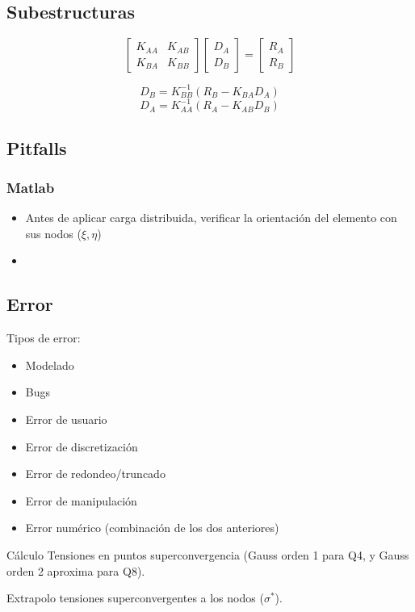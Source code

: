 \documentclass[11pt, a4paper,titlepage]{article}
\newcommand{\rmfont}[1]{{\fontfamily{ptm}\selectfont%
#1}}
\newcommand{\Matlab}{\rmfont{\sc Matlab}}
\begin{document}
\subsection{Subestructuras}
\[
\begin{bmatrix}
    K_{AA} & K_{AB} \\
    K_{BA} & K_{BB}
\end{bmatrix}
\begin{bmatrix}
    D_A \\
    D_B
\end{bmatrix}
= \begin{bmatrix}
    R_A \\
    R_B
\end{bmatrix}
\]

\[ 
D_B = K_{BB}^{-1} (R_B - K_{BA}D_A)
\]
\[
D_A =K_{AA}^{-1}(R_A-K_{AB}D_B)
\]

\subsection{Pitfalls}
\subsubsection*{\Matlab{}}
\begin{itemize}
    \item Antes de aplicar carga distribuida, verificar la orientación del elemento con sus nodos ($\xi,\eta$)
    \item
\end{itemize}
\subsection{Error}
Tipos de error:
\begin{itemize}
    \item Modelado
    \item Bugs
    \item Error de usuario
    \item Error de discretización
    \item Error de redondeo/truncado
    \item Error de manipulación 
    \item Error numérico (combinación de los dos anteriores)
\end{itemize}

Cálculo Tensiones en puntos superconvergencia (Gauss orden 1 para Q4, y Gauss orden 2 aproxima para Q8).

Extrapolo tensiones superconvergentes a los nodos ($\sigma^*$).
\end{document}
